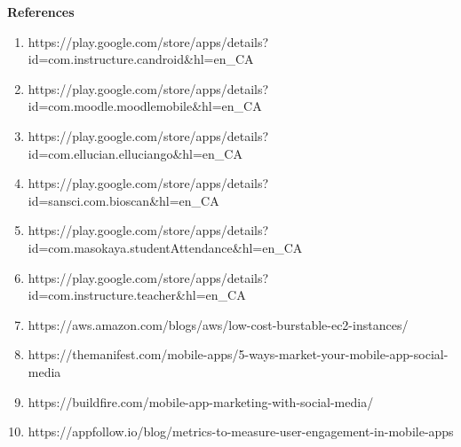 \begin{titlepage}
    \begin{center}
        \Huge
        \textbf{References}
    \end{center}
    \vspace{1cm}
    \begin{enumerate}
        \item https://play.google.com/store/apps/details?id=com.instructure.candroid\&hl=en\_CA

        \item https://play.google.com/store/apps/details?id=com.moodle.moodlemobile\&hl=en\_CA
    
        \item https://play.google.com/store/apps/details?id=com.ellucian.elluciango\&hl=en\_CA
    
        \item https://play.google.com/store/apps/details?id=sansci.com.bioscan\&hl=en\_CA
    
        \item https://play.google.com/store/apps/details?id=com.masokaya.studentAttendance\&hl=en\_CA
    
        \item https://play.google.com/store/apps/details?id=com.instructure.teacher\&hl=en\_CA
        
        \item https://aws.amazon.com/blogs/aws/low-cost-burstable-ec2-instances/

        \item https://themanifest.com/mobile-apps/5-ways-market-your-mobile-app-social-media
        
        \item https://buildfire.com/mobile-app-marketing-with-social-media/

        \item https://appfollow.io/blog/metrics-to-measure-user-engagement-in-mobile-apps

    \end{enumerate}
\end{titlepage}
